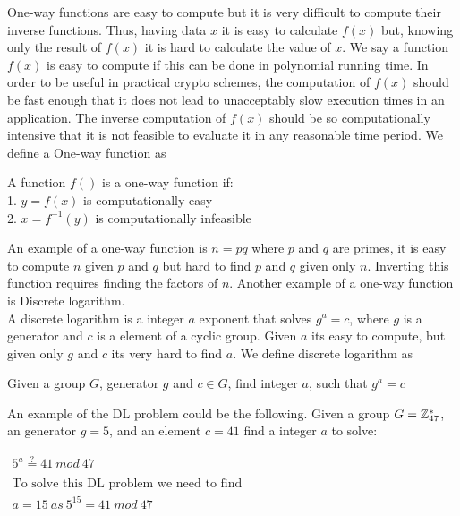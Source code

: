  One-way functions are easy to compute but it is very difficult to compute their inverse functions. Thus, having data $x$ it is easy to calculate $f(x)$ but,  
knowing only the result of $f(x)$ it is hard to calculate the value of $x$. We say a function $f(x)$ is easy to compute if this can be done in polynomial running time. 
In order to be useful in practical crypto schemes, the computation of $f(x)$ should be fast enough that it does not lead to unacceptably slow execution times in an application. The inverse
computation of $f(x)$ should be so computationally intensive that it is not feasible to evaluate it in any reasonable time period. We define a One-way function as \\

\begin{defi}
A function $f()$ is a one-way function if:      \\
1. $y = f (x)$ is computationally easy           \\
2. $x = f^{-1}(y)$ is computationally infeasible    
\end{defi}

\noindent
An example of a one-way function is $n = pq$ where $p$ and $q$ are primes, it is easy to compute $n$ given $p$ and $q$ but hard to find $p$ and $q$ given only $n$. 
Inverting this function requires finding the factors of $n$.
Another example of a one-way function is Discrete logarithm. \\


 A discrete logarithm is a integer $a$ exponent that solves $g^a=c$, where $g$ is a generator and $c$ is a element of a cyclic group. Given $a$ its easy to compute, but given only $g$ and $c$ its very hard to find $a$. We define discrete logarithm as \\

\begin{defi}
Given a group $G$, generator $g$ and $c \in G$, find integer $a$, such that $g^a = c$
\end{defi}

\noindent
An example of the DL problem could be the following. Given a group $G = \mathbb{Z}_{47}^*$, an generator $g=5$, and an element $c = 41$ find a integer $a$ to solve: 

\begin{center}
$
\begin{array}{l}
     5^a \stackrel{?}{=} 41 \ mod \ 47 \\
     \\
     \text{To solve this DL problem we need to find} \\
     a = 15 \ as \ 5^{15} = 41 \ mod \ 47
\end{array}
$
\end{center}

